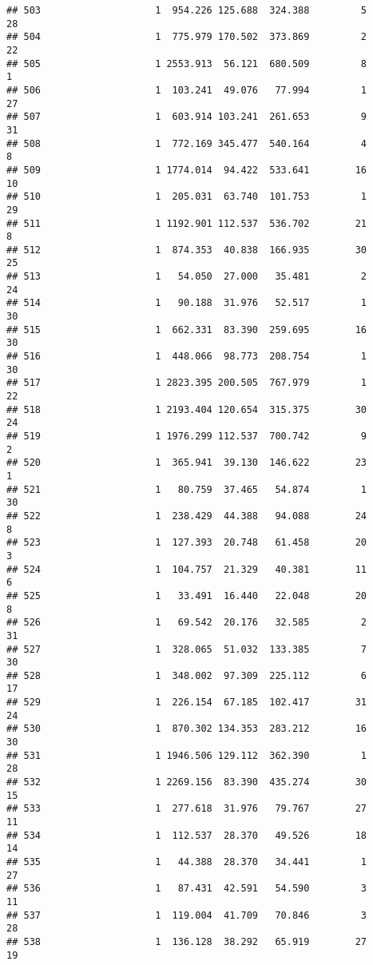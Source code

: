 \documentclass[
]{article}
\begin{document}
\begin{verbatim}
## 503                    1  954.226 125.688  324.388         5        28
## 504                    1  775.979 170.502  373.869         2        22
## 505                    1 2553.913  56.121  680.509         8         1
## 506                    1  103.241  49.076   77.994         1        27
## 507                    1  603.914 103.241  261.653         9        31
## 508                    1  772.169 345.477  540.164         4         8
## 509                    1 1774.014  94.422  533.641        16        10
## 510                    1  205.031  63.740  101.753         1        29
## 511                    1 1192.901 112.537  536.702        21         8
## 512                    1  874.353  40.838  166.935        30        25
## 513                    1   54.050  27.000   35.481         2        24
## 514                    1   90.188  31.976   52.517         1        30
## 515                    1  662.331  83.390  259.695        16        30
## 516                    1  448.066  98.773  208.754         1        30
## 517                    1 2823.395 200.505  767.979         1        22
## 518                    1 2193.404 120.654  315.375        30        24
## 519                    1 1976.299 112.537  700.742         9         2
## 520                    1  365.941  39.130  146.622        23         1
## 521                    1   80.759  37.465   54.874         1        30
## 522                    1  238.429  44.388   94.088        24         8
## 523                    1  127.393  20.748   61.458        20         3
## 524                    1  104.757  21.329   40.381        11         6
## 525                    1   33.491  16.440   22.048        20         8
## 526                    1   69.542  20.176   32.585         2        31
## 527                    1  328.065  51.032  133.385         7        30
## 528                    1  348.002  97.309  225.112         6        17
## 529                    1  226.154  67.185  102.417        31        24
## 530                    1  870.302 134.353  283.212        16        30
## 531                    1 1946.506 129.112  362.390         1        28
## 532                    1 2269.156  83.390  435.274        30        15
## 533                    1  277.618  31.976   79.767        27        11
## 534                    1  112.537  28.370   49.526        18        14
## 535                    1   44.388  28.370   34.441         1        27
## 536                    1   87.431  42.591   54.590         3        11
## 537                    1  119.004  41.709   70.846         3        28
## 538                    1  136.128  38.292   65.919        27        19

\end{verbatim}
\end{document}
